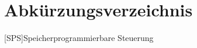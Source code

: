 \chapter*{Abkürzungsverzeichnis}
\begin{acronym}
    [SPS]{Speicherprogrammierbare Steuerung}
\end{acronym}